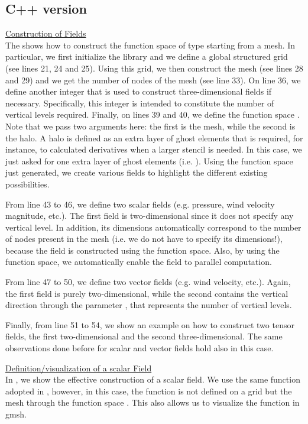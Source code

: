 \subsection{C++ version}
%
\begin{description}
%
\item \underline{Construction of Fields}\\[0.5em]
%
The  shows how to construct the function space 
 of type  starting from a mesh.
In particular, we first initialize 
the \Atlas library and we define a global structured grid (see lines 
21, 24 and 25). Using this grid, we then construct the mesh (see 
lines 28 and 29) and we get the number of nodes of the mesh (see line 
33). On line 36, we define another integer that is used to construct 
three-dimensional fields if necessary. Specifically, this integer 
is intended to constitute the number of vertical levels required. 
Finally, on lines 39 and 40, we define the function space .
Note that we pass two arguments here: the first is the mesh, while the 
second is the halo. A halo is defined as an extra layer of ghost elements
that is required, for instance, to calculated derivatives when a larger 
stencil is needed. In this case, we just asked for one extra layer of 
ghost elements (i.e. ). 
Using the function space  just generated, we create 
various fields to highlight the different existing possibilities.

From line 43 to 46, we define two scalar fields (e.g. pressure, 
wind velocity magnitude, etc.). The first field is two-dimensional 
since it does not specify any vertical level. In addition, its 
dimensions automatically correspond to the number of nodes present 
in the mesh (i.e. we do not have to specify its dimensions!), because 
the field is constructed using the function space. Also, by using the 
function space, we automatically enable the field to parallel computation.

From line 47 to 50, we define two vector fields (e.g. wind velocity, etc.).
Again, the first field is purely two-dimensional, while the second contains 
the vertical direction through the parameter , that represents
the number of vertical levels. 

Finally, from line 51 to 54, we show an example on how to construct 
two tensor fields, the first two-dimensional and the second three-dimensional.
The same observations done before for scalar and vector fields hold 
also in this case.
%

%
%
\item \underline{Definition/visualization of a scalar Field}\\[0.5em]
%
%
In , we show the effective construction 
of a scalar field. We use the same function adopted in , 
however, in this case, the function is not defined on a grid but 
the mesh through the function space . This also allows 
us to visualize the function in gmsh.


\end{description}
